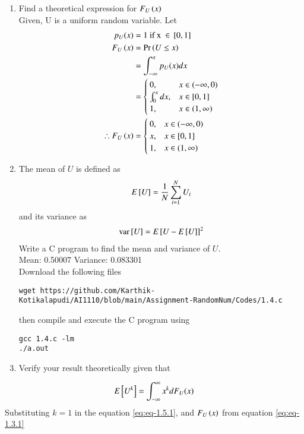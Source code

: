 \documentclass[journal,12pt,twocolumn]{IEEEtran}
\renewcommand\thesection{\arabic{section}}
\begin{document}
\begin{enumerate}[label=\thesection.\arabic*
,ref=\thesection.\theenumi]
\item Find a theoretical expression for $F_U\left(x\right)$\\
\solution
Given, U is a uniform random variable. Let
\begin{align}
     p_U(x) &= 1 \text{ if x } \in {}\left[0,1\right]
     \\
     F_U\left(x\right) &= \Pr\left(U \le x\right) 
     \\
     &= \int^{x}_{-\infty}p_U(x)dx
     \\
     &=
     \begin{cases}
        0, & x \in (-\infty,0) \\
        \int^{x}_{0}dx, & x \in [0,1]\\
        1, & x \in (1,\infty)
    \end{cases}
	\\	\therefore F_U\left(x\right) &=
	\begin{cases}
        0, & x \in (-\infty,0) \\
        x, & x \in [0,1]\\
        1, & x \in (1,\infty)
    \end{cases}
	\label{eq:eq-1.3.1}
\end{align}
\item
The mean of $U$ is defined as
%
\begin{align}
	E{}\left[U\right] = \frac{1}{N}\sum_{i=1}^{N}U_i
\end{align}
%
and its variance as
%
\begin{align}
\text{var}{}\left[U\right] = E{}\left[U- E{}\left[U\right]\right]^2 
\end{align}
Write a C program to  find the mean and variance of $U$.\\
\solution 
Mean: 0.50007 Variance: 0.083301\\
Download the following files 
\begin{lstlisting}
wget https://github.com/Karthik-Kotikalapudi/AI1110/blob/main/Assignment-RandomNum/Codes/1.4.c
\end{lstlisting}
then compile and execute the C program using
\begin{lstlisting}
gcc 1.4.c -lm
./a.out
\end{lstlisting}
\item Verify your result theoretically given that
\end{enumerate}
%
\begin{align}
	E{}\left[U^k\right] = \int_{-\infty}^{\infty}x^kdF_{U}(x)
	\label{eq:eq-1.5.1}
\end{align}
\solution Substituting $k=1$ in the equation \eqref{eq:eq-1.5.1}, and $F_U\left(x\right)$ from equation \eqref{eq:eq-1.3.1}
\end{document}
